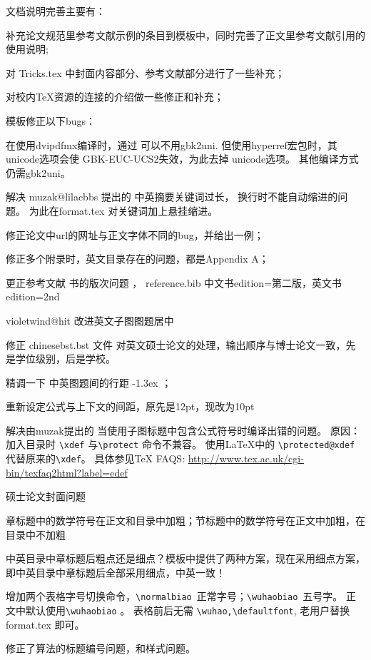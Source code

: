 文档说明完善主要有：
\begin{hitlist}
  \item 补充论文规范里参考文献示例的条目到模板中，同时完善了正文里参考文献引用的使用说明;
  \item 对 Tricks.tex 中封面内容部分、参考文献部分进行了一些补充；
  \item 对校内TeX资源的连接的介绍做一些修正和补充；
\end{hitlist}


模板修正以下bugs：
\begin{hitlist}
    \item 在使用dvipdfmx编译时，通过  可以不用gbk2uni.
        但使用hyperref宏包时，其unicode选项会使 GBK-EUC-UCS2失效，为此去掉
        unicode选项。 其他编译方式 仍需gbk2uni。
    \item 解决 muzak@lilacbbs 提出的 中英摘要关键词过长，
换行时不能自动缩进的问题。 为此在format.tex 对关键词加上悬挂缩进。
    \item 修正论文中url的网址与正文字体不同的bug，并给出一例；
    \item 修正多个附录时，英文目录存在的问题，都是Appendix A；
    \item 更正参考文献 书的版次问题 ， reference.bib 中文书edition={第二版}，英文书 edition={2nd}
    \item violetwind@hit  改进英文子图图题居中
    \item 修正 chinesebst.bst 文件 对英文硕士论文的处理，输出顺序与博士论文一致，先是学位级别，后是学校。
    \item 精调一下 中英图题间的行距 -1.3ex ；
    \item 重新设定公式与上下文的间距，原先是12pt，现改为10pt
    \item 解决由muzak提出的 当使用子图标题中包含公式符号时编译出错的问题。
原因：加入目录时 \verb|\xdef| 与\verb|\protect| 命令不兼容。 使用LaTeX中的 \verb|\protected@xdef|  代替原来的\verb|\xdef|。
具体参见TeX FAQS: \url{http://www.tex.ac.uk/cgi-bin/texfaq2html?label=edef}
	\item 硕士论文封面问题
	\item 章标题中的数学符号在正文和目录中加粗；节标题中的数学符号在正文中加粗，在目录中不加粗
	\item 中英目录中章标题后粗点还是细点？模板中提供了两种方案，现在采用细点方案，即中英目录中章标题后全部采用细点，中英一致！
	\item 增加两个表格字号切换命令，\verb+\normalbiao+~正常字号；\verb+\wuhaobiao+~五号字。 正文中默认使用\verb+\wuhaobiao+ 。
表格前后无需 \verb+\wuhao,\defaultfont+, 老用户替换 format.tex 即可。
  \item 修正了算法的标题编号问题，和样式问题。
\end{hitlist}


